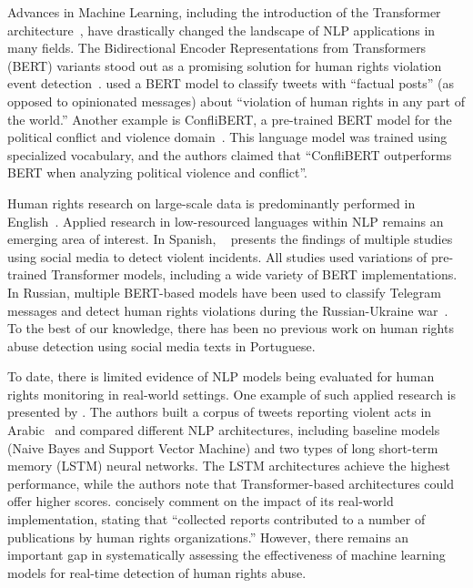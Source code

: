 \documentclass[11pt,letterpaper]{article}
\begin{document}
Advances in Machine Learning, including the introduction of the Transformer architecture~\citep{vaswaniAttentionAllYou2017}, have drastically changed the landscape of NLP applications in many fields. The Bidirectional Encoder Representations from Transformers (BERT) variants stood out as a promising solution for human rights violation event detection~\citep{nemkovaDetectingHumanRights2023,hu_conflibert_2022,taGANBERTAdversarialLearning2022,alhelbawyNLPPoweredHumanRights2020}. \citet{pilankarDetectingViolationHuman2022} used a BERT model to classify tweets with ``factual posts'' (as opposed to opinionated messages) about ``violation of human rights in any part of the world.'' 
Another example is ConfliBERT, a pre-trained BERT model for the political conflict and violence domain~\citep{hu_conflibert_2022}. This language model was trained using specialized vocabulary, and the authors claimed that ``ConfliBERT outperforms BERT when analyzing political violence and conflict''.

Human rights research on large-scale data is predominantly performed in English~\citep{hu_conflibert_2022, pavlickGunViolenceDatabase2016}. Applied research in low-resourced languages within NLP remains an emerging area of interest. In Spanish, ~\citet{taGANBERTAdversarialLearning2022} presents the findings of multiple studies using social media to detect violent incidents. All studies used variations of pre-trained Transformer models, including a wide variety of BERT implementations. In Russian, multiple BERT-based models have been used to classify Telegram messages and detect human rights violations during the Russian-Ukraine war~\citep{nemkovaDetectingHumanRights2023}. To the best of our knowledge, there has been no previous work on human rights abuse detection using social media texts in Portuguese.

To date, there is limited evidence of NLP models being evaluated for human rights monitoring in real-world settings. One example of such applied research is presented by \citet{alhelbawyNLPPoweredHumanRights2020}. The authors built a corpus of tweets reporting violent acts in Arabic~\citep{alhelbawyCorpusViolenceActs2016} and compared different NLP architectures, including baseline models (Naive Bayes and Support Vector Machine) and two types of long short-term memory (LSTM) neural networks. The LSTM architectures achieve the highest performance, while the authors note that Transformer-based architectures could offer higher scores. \citet{alhelbawyNLPPoweredHumanRights2020} concisely comment on the impact of its real-world implementation, stating that ``collected reports contributed to a number of publications by human rights organizations.'' However, there remains an important gap in systematically assessing the effectiveness of machine learning models for real-time detection of human rights abuse.
\end{document}
